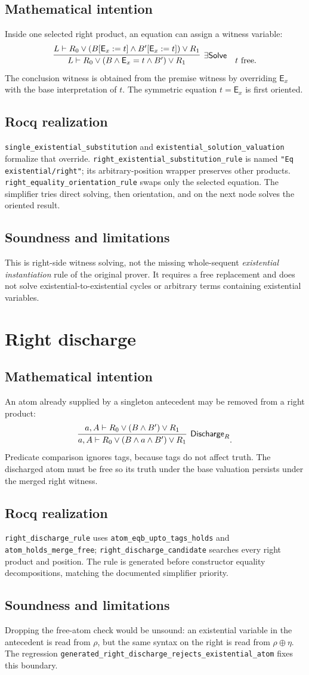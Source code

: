 \documentclass[11pt,oneside]{book}
\DeclareRobustCommand{\code}[1]{\nolinkurl{#1}}
\newcommand{\EV}{\mathsf{E}}
\newcommand{\mathintent}{\subsection*{Mathematical intention}}
\newcommand{\rocqreal}{\subsection*{Rocq realization}}
\newcommand{\soundlim}{\subsection*{Soundness and limitations}}
\begin{document}
\mathintent

Inside one selected right product, an equation can assign a witness variable:
\[
 \infer[\exists\mathsf{Solve}]
       {L\vdash R_0\lor(B\land \EV_x=t\land B')\lor R_1}
       {L\vdash R_0\lor(B[\EV_x:=t]\land B'[\EV_x:=t])\lor R_1}
 \quad t\text{ free}.
\]
The conclusion witness is obtained from the premise witness by overriding
\(\EV_x\) with the base interpretation of \(t\).  The symmetric equation
\(t=\EV_x\) is first oriented.

\rocqreal

\code{single_existential_substitution} and
\code{existential_solution_valuation} formalize that override.
\code{right_existential_substitution_rule} is named
\code{"Eq existential/right"}; its arbitrary-position wrapper preserves other
products.  \code{right_equality_orientation_rule} swaps only the selected
equation.  The simplifier tries direct solving, then orientation, and on the
next node solves the oriented result.

\soundlim

This is right-side witness solving, not the missing whole-sequent
\emph{existential instantiation} rule of the original prover.  It requires a
free replacement and does not solve existential-to-existential cycles or
arbitrary terms containing existential variables.

\section{Right discharge}

\mathintent

An atom already supplied by a singleton antecedent may be removed from a right
product:
\[
 \infer[\mathsf{Discharge}_R]
       {a,A\vdash R_0\lor(B\land a\land B')\lor R_1}
       {a,A\vdash R_0\lor(B\land B')\lor R_1}.
\]
Predicate comparison ignores tags, because tags do not affect truth.  The
discharged atom must be free so its truth under the base valuation persists
under the merged right witness.

\rocqreal

\code{right_discharge_rule} uses
\code{atom_eqb_upto_tags_holds} and \code{atom_holds_merge_free};
\code{right_discharge_candidate} searches every right product and position.
The rule is generated before constructor equality decompositions, matching the
documented simplifier priority.

\soundlim

Dropping the free-atom check would be unsound: an existential variable in the
antecedent is read from \(\rho\), but the same syntax on the right is read from
\(\rho\oplus\eta\).  The regression
\code{generated_right_discharge_rejects_existential_atom} fixes this boundary.
\end{document}
